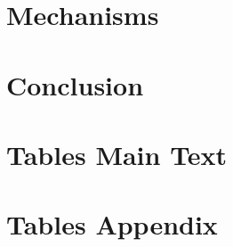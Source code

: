 \section{Mechanisms}







\section{Conclusion}




\clearpage

\appendix

\section{Tables Main Text}


\clearpage


\clearpage


\clearpage


\section*{Tables Appendix}


\clearpage


\clearpage


\clearpage


\clearpage

